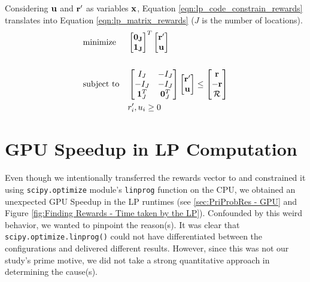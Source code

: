 Considering $\mathbf{u}$ and $\mathbf{r'}$ as variables $\mathbf{x}$, Equation \ref{eqn:lp_code_constrain_rewards} translates into Equation \ref{eqn:lp_matrix_rewards} ($J$ is the number of locations).
\begin{equation} \label{eqn:lp_matrix_rewards}
\begin{aligned}
& \text{minimize}
& & \begin{bmatrix}
\mathbf{0_J}\\
\mathbf{1_J}\\
\end{bmatrix}^T
\begin{bmatrix}
\mathbf{r'}\\
\mathbf{u}
\end{bmatrix}\\ \\
& \text{subject to}
& & \begin{bmatrix}
I_J & -I_J\\
-I_J & -I_J\\
\mathbf{1}^T_J & \mathbf{0}^T_J\\
\end{bmatrix}
\begin{bmatrix}
\mathbf{r'}\\
\mathbf{u}\\
\end{bmatrix} \leq
\begin{bmatrix}
\mathbf{r}\\
-\mathbf{r}\\
\mathcal{R}\\
\end{bmatrix}\\
&&& r'_i, u_i \geq 0
\end{aligned}
\end{equation}

\chapter{GPU Speedup in LP Computation} \label{app:GPU Speedup in LP Computation}
Even though we intentionally transferred the rewards vector to and constrained it using \texttt{scipy.optimize} module's \texttt{linprog} function on the CPU, we obtained an unexpected GPU Speedup in the LP runtimes (see \cref{sec:PriProbRes - GPU} and Figure \ref{fig:Finding Rewards - Time taken by the LP}). Confounded by this weird behavior, we wanted to pinpoint the reason(s). It was clear that \texttt{scipy.optimize.linprog()} could not have differentiated between the configurations and delivered different results. However, since this was not our study's prime motive, we did not take a strong quantitative approach in determining the cause(s).

